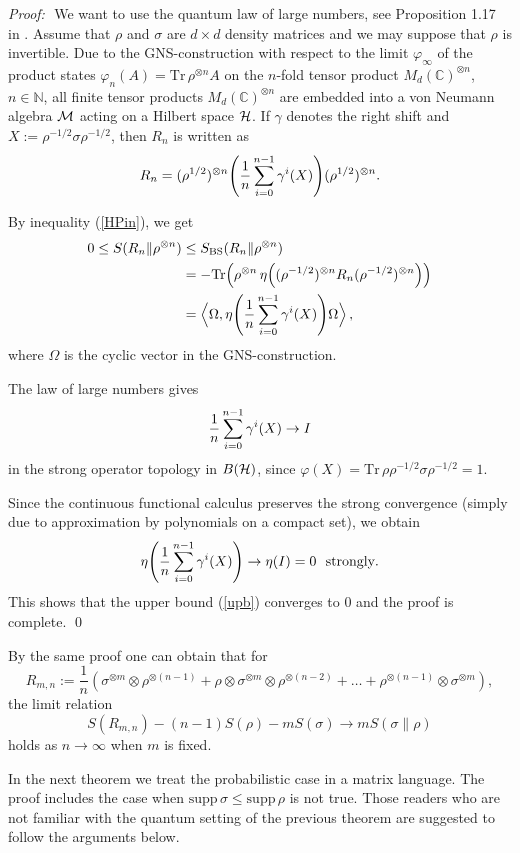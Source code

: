 \documentclass[12pt,a4paper]{article}
\def\Tr{{\mathrm{Tr}}}
\def\<{\langle}
\def\>{\rangle}
\def\supp{\mathrm{supp}\,}
\def\bbbc{\mathbb{C}}
\def\iH{{\cal H}}
\def\iM{{\cal M}}
\def\ot{\otimes}
\def\proof{{\it Proof:}\,\,}
\def\bbbn{\mathbb{N}}
\begin{document}
\proof
We want to use the quantum law of large numbers, see Proposition 1.17
in \cite{OP}. Assume that $\rho$ and $\sigma$ are $d \times d$ density matrices
and we may suppose that $\rho$ is invertible. Due to the GNS-construction
with respect to the limit $\varphi_\infty$ of the product states $\varphi_n(A)
=\Tr\,\rho^{\ot n}A$ on the $n$-fold tensor product $M_d(\bbbc)^{\ot n}$,
$n \in \bbbn$, all finite tensor products $M_d(\bbbc)^{\ot n}$ are embedded into
a von Neumann algebra $\iM$ acting on a Hilbert space $\iH$. If $\gamma$ denotes
the right shift and $X:=\rho^{-1/2}\sigma\rho^{-1/2}$, then $R_n$ is written as
$$
R_n=(\rho^{1/2})^{\otimes n}\Biggl({1\over n}\sum_{i=0}^{n-1}\gamma^i(X)\Biggr)
(\rho^{1/2})^{\otimes n}.
$$

By  inequality (\ref{HPin}), we get
\begin{align}
0\le S(R_n\|\rho^{\otimes n})
&\le S_{\mathrm{BS}}(R_n\|\rho^{\otimes n}) \nonumber \\
&=-\Tr \Bigl(\rho^{\otimes n}\,
\eta\Bigl((\rho^{-1/2})^{\otimes n}R_n(\rho^{-1/2})^{\otimes n}\Bigr)\Bigr)
\nonumber\\
&=\Big\< \Omega ,\eta\Biggl({1\over n}\sum_{i=0}^{n-1}
\gamma^i(X)\Biggr)\Omega\Big\>\,,\label{upb}
\end{align}
where $\Omega$ is the cyclic vector in the GNS-construction.

The law of large numbers gives
$$
{1\over n}\sum_{i=0}^{n-1}\gamma^i(X) \to I $$
in the strong operator topology in $B(\iH)$, since $\varphi(X)=\Tr\,\rho\rho^{-1/2}
\sigma\rho^{-1/2}=1$.

Since the continuous functional calculus preserves the strong convergence
(simply due to approximation by polynomials on a compact set), we obtain
$$
\eta\Biggl({1\over n}\sum_{i=0}^{n-1}\gamma^i(X)\Biggr)
\to \eta(I)=0\ \ \mbox{strongly}.
$$
This shows that the upper bound (\ref{upb}) converges to 0 and the
proof is complete. \qed

By the same proof one can obtain that for
$$
R_{m,n}:=\frac{1}{n}\left(\sigma^{\otimes m}\ot \rho^{\ot(n-1)}
+\rho \ot \sigma^{\otimes m} \ot \rho^{\ot(n-2)}
+  \dots  + \rho^{\ot(n-1)} \ot \sigma^{\otimes m}\right),
$$
the limit relation
\begin{equation}
S(R_{m,n})-(n-1)S(\rho)-mS(\sigma) \to m S(\sigma\|\rho)
\end{equation}
holds as $n\to\infty$ when $m$ is fixed.

In the next theorem we treat the probabilistic case in a matrix language.
The proof includes the case when  $\supp \sigma \le \supp \rho$ is not true. Those
readers who are not familiar with the quantum setting of the previous theorem are
suggested to follow the arguments below.
\end{document}
